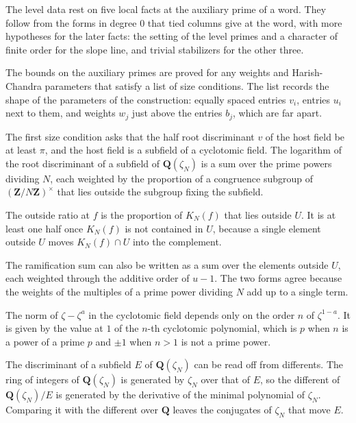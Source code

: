 The level data rest on five local facts at the auxiliary prime of a word. They
follow from the forms in degree $0$ that tied columns give at the word, with
more hypotheses for the later facts: the setting of the level primes and a
character of finite order for the slope line, and trivial stabilizers for the
other three.

The bounds on the auxiliary primes are proved for any weights and
Harish-Chandra parameters that satisfy a list of size conditions. The list
records the shape of the parameters of the construction: equally spaced
entries $v_i$, entries $u_i$ next to them, and weights $w_j$ just above the
entries $b_j$, which are far apart.

The first size condition asks that the half root discriminant $v$ of the host
field be at least $\pi$, and the host field is a subfield of a cyclotomic field.
The logarithm of the root discriminant of a subfield of $\mathbf Q(\zeta_N)$ is a
sum over the prime powers dividing $N$, each weighted by the proportion of a
congruence subgroup of $(\mathbf Z/N\mathbf Z)^\times$ that lies outside the
subgroup fixing the subfield.

The outside ratio at $f$ is the proportion of $K_N(f)$ that lies outside $U$. It
is at least one half once $K_N(f)$ is not contained in $U$, because a single
element outside $U$ moves $K_N(f)\cap U$ into the complement.

The ramification sum can also be written as a sum over the elements outside
$U$, each weighted through the additive order of $u-1$. The two forms agree
because the weights of the multiples of a prime power dividing $N$ add up to a
single term.

The norm of $\zeta-\zeta^a$ in the cyclotomic field depends only on the order $n$
of $\zeta^{1-a}$. It is given by the value at $1$ of the $n$-th cyclotomic
polynomial, which is $p$ when $n$ is a power of a prime $p$ and $\pm1$ when $n>1$
is not a prime power.

The discriminant of a subfield $E$ of $\mathbf Q(\zeta_N)$ can be read off from
differents. The ring of integers of $\mathbf Q(\zeta_N)$ is generated by $\zeta_N$
over that of $E$, so the different of $\mathbf Q(\zeta_N)/E$ is generated by the
derivative of the minimal polynomial of $\zeta_N$. Comparing it with the
different over $\mathbf Q$ leaves the conjugates of $\zeta_N$ that move $E$.

